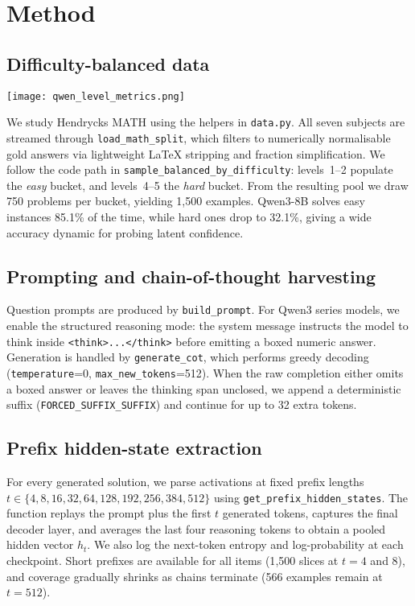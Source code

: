 \documentclass[10pt,a4paper,twocolumn]{article}
\begin{document}
\section{Method}
\label{sec:method}
\subsection{Difficulty-balanced data}

\begin{center}
\begin{minipage}{1.02\columnwidth}
  \centering
  \texttt{[image: qwen\_level\_metrics.png]}
  \label{fig:raw-cf}
\end{minipage}
\end{center}


We study Hendrycks MATH \cite{hendrycksmath2021} using the helpers in \texttt{data.py}.  All seven subjects are streamed through \texttt{load\_math\_split}, which filters to numerically normalisable gold answers via lightweight LaTeX stripping and fraction simplification.  We follow the code path in \texttt{sample\_balanced\_by\_difficulty}: levels~1--2 populate the \emph{easy} bucket, and levels~4--5 the \emph{hard} bucket.  From the resulting pool we draw 750 problems per bucket, yielding 1{,}500 examples. Qwen3-8B solves easy instances 85.1\% of the time, while hard ones drop to 32.1\%, giving a wide accuracy dynamic for probing latent confidence.

\subsection{Prompting and chain-of-thought harvesting}
Question prompts are produced by \texttt{build\_prompt}.  For Qwen3 series models, we enable the structured reasoning mode: the system message instructs the model to think inside \verb|<think>...</think>| before emitting a boxed numeric answer.  Generation is handled by \texttt{generate\_cot}, which performs greedy decoding (\texttt{temperature}=0, \texttt{max\_new\_tokens}=512).  When the raw completion either omits a boxed answer or leaves the thinking span unclosed, we append a deterministic suffix (\texttt{FORCED\_SUFFIX\_SUFFIX}) and continue for up to 32 extra tokens.

\subsection{Prefix hidden-state extraction}
For every generated solution, we parse activations at fixed prefix lengths $t \in \{4,8,16,32,64,128,192,256,384,512\}$ using \texttt{get\_prefix\_hidden\_states}.  The function replays the prompt plus the first $t$ generated tokens, captures the final decoder layer, and averages the last four reasoning tokens to obtain a pooled hidden vector $h_t$.  We also log the next-token entropy and log-probability at each checkpoint.  Short prefixes are available for all items (1{,}500 slices at $t{=}4$ and $8$), and coverage gradually shrinks as chains terminate (566 examples remain at $t{=}512$).
\end{document}
